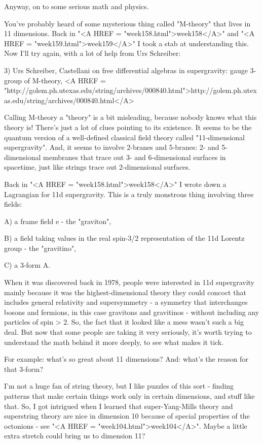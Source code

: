 Anyway, on to some serious math and physics.

You've probably heard of some mysterious thing called "M-theory"
that lives in 11 dimensions.  Back in "<A HREF = "week158.html">week158</A>" and "<A HREF = "week159.html">week159</A>" 
I took a stab at understanding this.  Now I'll try again, with
a lot of help from Urs Schreiber:

3) Urs Schreiber, Castellani on free differential algebras
in supergravity: gauge 3-group of M-theory, 
<A HREF = "http://golem.ph.utexas.edu/string/archives/000840.html">http://golem.ph.utexas.edu/string/archives/000840.html</A>

Calling M-theory a "theory" is a bit misleading, because nobody 
knows what this theory is!  There's just a lot of clues pointing
to its existence.  It seems to be the quantum version of a 
well-defined classical field theory called "11-dimensional 
supergravity".   And, it seems to involve 2-branes and 5-branes:
2- and 5-dimensional membranes that trace out 3- and 6-dimensional 
surfaces in spacetime, just like strings trace out 2-dimensional 
surfaces.  

Back in "<A HREF = "week158.html">week158</A>" I wrote down a Lagrangian for 11d supergravity.
This is a truly monstrous thing involving three fields:

A) a frame field e - the "graviton",

B) a field \psi  taking values in the real spin-3/2 
representation of the 11d Lorentz group - the "gravitino",

C) a 3-form A. 

When it was discovered back in 1978, people were
interested in 11d supergravity mainly because it was the
highest-dimensional theory they could concoct that includes 
general relativity and supersymmetry - a symmetry that interchanges 
bosons and fermions, in this case gravitons and gravitinos - 
without including any particles of spin > 2.  So, the fact that 
it looked like a mess wasn't such a big deal.  But now that 
some people are taking it very seriously, it's worth trying 
to understand the math behind it more deeply, to see what makes 
it tick.

For example: what's so great about 11 dimensions?  And: 
what's the reason for that 3-form?

I'm not a huge fan of string theory, but I like puzzles of
this sort - finding patterns that make certain things work
only in certain dimensions, and stuff like that.  So, I got 
intrigued when I learned that super-Yang-Mills theory and
superstring theory are nice in dimension 10 because of special 
properties of the octonions - see "<A HREF = "week104.html">week104</A>".  Maybe a little
extra stretch could bring us to dimension 11?   

